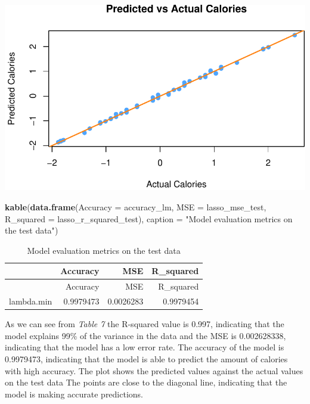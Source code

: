 \documentclass[
]{article}
\newenvironment{Shaded}{\begin{snugshade}}{\end{snugshade}}
\newcommand{\AttributeTok}[1]{\textcolor[rgb]{0.13,0.29,0.53}{#1}}
\newcommand{\FunctionTok}[1]{\textcolor[rgb]{0.13,0.29,0.53}{\textbf{#1}}}
\newcommand{\NormalTok}[1]{#1}
\newcommand{\StringTok}[1]{\textcolor[rgb]{0.31,0.60,0.02}{#1}}
\begin{document}
\begin{center}\includegraphics{Statistical_Learning_Final_Report_files/figure-latex/accuracy_lm-1} \end{center}

\begin{Shaded}
\begin{Highlighting}[]
\FunctionTok{kable}\NormalTok{(}\FunctionTok{data.frame}\NormalTok{(}\AttributeTok{Accuracy =}\NormalTok{ accuracy\_lm, }\AttributeTok{MSE =}\NormalTok{ lasso\_mse\_test, }
                 \AttributeTok{R\_squared =}\NormalTok{ lasso\_r\_squared\_test),}
      \AttributeTok{caption =} \StringTok{"Model evaluation metrics on the test data"}\NormalTok{)}
\end{Highlighting}
\end{Shaded}

\begin{longtable}[]{@{}lrrr@{}}
\caption{Model evaluation metrics on the test data}\tabularnewline
\toprule\noalign{}
& Accuracy & MSE & R\_squared \\
\midrule\noalign{}
\endfirsthead
\toprule\noalign{}
& Accuracy & MSE & R\_squared \\
\midrule\noalign{}
\endhead
\bottomrule\noalign{}
\endlastfoot
lambda.min & 0.9979473 & 0.0026283 & 0.9979454 \\
\end{longtable}

As we can see from \emph{Table 7} the R-squared value is 0.997,
indicating that the model explains 99\% of the variance in the data and
the MSE is 0.002628338, indicating that the model has a low error rate.
The accuracy of the model is 0.9979473, indicating that the model is
able to predict the amount of calories with high accuracy. The plot
shows the predicted values against the actual values on the test data
The points are close to the diagonal line, indicating that the model is
making accurate predictions.
\end{document}

